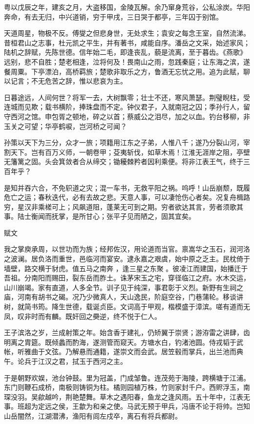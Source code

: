 
粤以戊辰之年，建亥之月，大盗移国，金陵瓦解。余乃窜身荒谷，公私涂炭。华阳奔命，有去无归，中兴道销，穷于甲戌，三日哭于都亭，三年囚于别馆。

天道周星，物极不反。傅燮之但悲身世，无处求生；袁安之每念王室，自然流涕。昔桓君山之志事，杜元凯之平生，并有著书，咸能自序。潘岳之文采，始述家风；陆机之辞赋，先陈世德。信年始二毛，即逢丧乱，藐是流离，至于暮齿。《燕歌》远别，悲不自胜；楚老相逢，泣将何及！畏南山之雨，忽践秦庭；让东海之滨，遂餐周粟。下亭漂泊，高桥羁旅；楚歌非取乐之方，鲁酒无忘忧之用。追为此赋，聊以记言；不无危苦之辞，惟以悲哀为主。

日暮途远，人间何世？将军一去，大树飘零；壮士不还，寒风萧瑟。荆璧睨柱，受连城而见欺；载书横阶，捧珠盘而不定。钟仪君子，入就南冠之囚；季孙行人，留守西河之馆。申包胥之顿地，碎之以首；蔡威公之泪尽，加之以血。钓台移柳，非玉关之可望；华亭鹤唳，岂河桥之可闻？

孙策以天下为三分，众才一旅；项籍用江东之子弟，人惟八千；遂乃分裂山河，宰割天下。岂有百万义师，一朝卷甲；芟夷斩伐，如草木焉！江淮无涯岸之阻，亭壁无籓篱之固。头会箕敛者合从缔交；锄耰棘矜者因利乘便。将非江表王气，终于三百年乎？

是知并吞六合，不免轵道之灾；混一车书，无救平阳之祸。呜呼！山岳崩颓，既履危亡之运；春秋迭代，必有去故之悲。天意人事，可以凄怆伤心者矣。况复舟楫路穷，星汉非乘槎可上；风飙道阻，蓬莱无可到之期。穷者欲达其言，劳者须歌其事。陆士衡闻而抚掌，是所甘心；张平子见而陋之，固其宜矣。

赋文

我之掌庾承周，以世功而为族；经邦佐汉，用论道而当官。禀嵩华之玉石，润河洛之波澜。居负洛而重世，邑临河而宴安。逮永嘉之艰虞，始中原之乏主。民枕倚于墙壁，路交横于豺虎。值五马之南奔 ，逢三星之东聚 。彼凌江而建国，始播迁于吾祖。分南阳而赐田，裂东岳而胙土。诛茅宋玉之宅，穿径临江之府。水木交运，山川崩竭。家有直道，人多全节。训子见于纯深，事君彰于义烈。新野有生祠之庙，河南有胡书之碣。况乃少微真人，天山逸民，阶庭空谷，门巷蒲轮。移谈讲树，就简书筠。降生世德，载诞贞臣。文词高于甲观，楷模盛于漳滨。嗟有道而无凤，叹非时而有麟。既奸回之奰逆，终不悦于仁人。

王子滨洛之岁，兰成射策之年。始含香于建礼，仍矫翼于崇贤；游洊雷之讲肆，齿明离之胄筵。既倾蠡而酌海，遂测管而窥天。方塘水白，钓渚池圆。侍戎韬于武帐，听雅曲于文弦。乃解悬而通籍，遂崇文而会武。居笠毂而掌兵，出兰池而典午。论兵于江汉之君，拭玉于西河之主。

于是朝野欢娱，池台钟鼓。里为冠盖，门成邹鲁。连茂苑于海陵，跨横塘于江浦。东门则鞭石成桥，南极则铸铜为柱。橘则园植万株，竹则家封千户。西赆浮玉，南琛没羽。吴歈越吟，荆艳楚舞。草木之遇阳春，鱼龙之逢风雨。五十年中，江表无事。班超为定远之侯，王歙为和亲之使。马武无预于甲兵，冯唐不论于将帅。岂知山岳闇然，江湖潜沸，渔阳有闾左戍卒，离石有将兵都尉。

